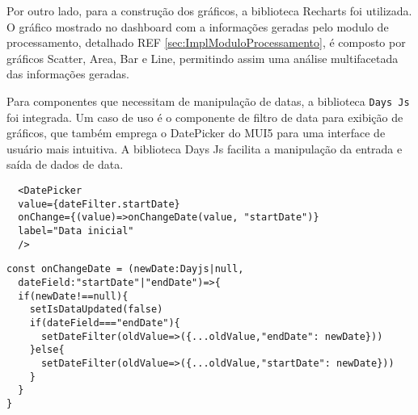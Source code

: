 Por outro lado, para a construção dos gráficos, a biblioteca Recharts foi utilizada. O gráfico mostrado no dashboard com a informações geradas pelo modulo de processamento, detalhado REF \ref{sec:ImplModuloProcessamento}, é composto por gráficos Scatter, Area, Bar e Line, permitindo assim uma análise multifacetada das informações geradas. 

Para componentes que necessitam de manipulação de datas, a biblioteca \texttt{Days Js} \cite{dayJsInstallation} foi integrada. Um caso de uso é o componente de filtro de data para exibição de gráficos, que também emprega o DatePicker \cite{muiDatePickerValidation} do \gls{MUI5} para uma interface de usuário mais intuitiva. A biblioteca Days Js facilita a manipulação da entrada e saída de dados de data.

\begin{verbatim}
  <DatePicker
  value={dateFilter.startDate}
  onChange={(value)=>onChangeDate(value, "startDate")}
  label="Data inicial"
  />
\end{verbatim}

\begin{verbatim}
const onChangeDate = (newDate:Dayjs|null, 
  dateField:"startDate"|"endDate")=>{
  if(newDate!==null){
    setIsDataUpdated(false)
    if(dateField==="endDate"){
      setDateFilter(oldValue=>({...oldValue,"endDate": newDate}))
    }else{
      setDateFilter(oldValue=>({...oldValue,"startDate": newDate}))
    }
  }
}
\end{verbatim}


